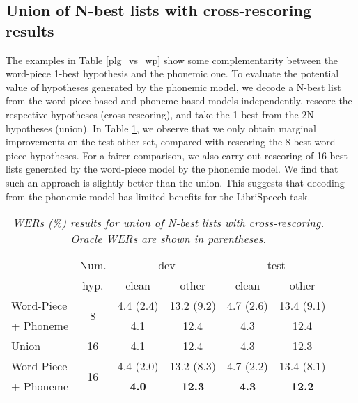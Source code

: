 \subsection{Union of N-best lists with cross-rescoring results}
\vspace{-1mm}
The examples in Table \ref{plg_vs_wp} show some complementarity between the word-piece 1-best hypothesis
and the phonemic one.
To evaluate the potential value of hypotheses generated by the phonemic model, 
we decode a N-best list from the word-piece based and phoneme based models independently,
rescore the respective hypotheses (cross-rescoring), and take the 1-best from the 2N hypotheses (union).
In Table \ref{tab:union}, we observe that we only obtain marginal improvements on the test-other set, compared with rescoring the 8-best
word-piece hypotheses. For a fairer comparison, we also carry out rescoring of 16-best lists generated by
the word-piece model by the phonemic model. We find that such an approach is slightly better than the union.
This suggests that decoding from the phonemic model has limited benefits for the LibriSpeech task.
	\vspace{-1mm}
\begin{table}[h]
	\centering
	\setlength{\tabcolsep}{0.3em}
		\vspace{-2mm}
	\caption{\it WERs (\%) results for union of N-best lists with
		cross-rescoring. Oracle WERs are shown in parentheses.}
	\vspace{-3mm}
	\label{tab:union}
		\begin{tabular}{ |l|c|c|c|c|c|} \hline
			\multirow{2}{*}{ } & Num.  & \multicolumn{2}{|c|}{dev} & \multicolumn{2}{|c|}{test}    \\ \cline{3-6}
			& hyp.  & clean & other & clean & other    \\ \hline
			Word-Piece      & \multirow{2}{*}{8} & 4.4 (2.4) & 13.2 (9.2) & 4.7 (2.6) & 13.4 (9.1) \\
			+ Phoneme      &   & 4.1 & 12.4 & 4.3 & 12.4 \\ \cline{2-6}
			Union     & 16 & 4.1 & 12.4 & 4.3 & 12.3 \\ \hline
			Word-Piece     & \multirow{2}{*}{16} & 4.4 (2.0) & 13.2 (8.3) & 4.7 (2.2) & 13.4 (8.1)   \\ 
			+ Phoneme      &  & \textbf{4.0} & \textbf{12.3} & \textbf{4.3} &  \textbf{12.2}   \\ \hline
			
			
		\end{tabular}
\end{table}
 \vspace{-4mm}
